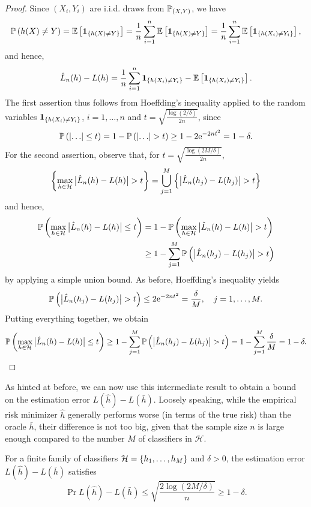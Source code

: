 \begin{proof}
Since $(X_i, Y_i)$ are i.i.d. draws from $\P_{(X, Y)}$, we have
\[
    \Pr{h(X) \neq Y} = \Ex{\indSet{h(X) \neq Y}} = \frac{1}{n} \sum_{i=1}^n \Ex{\indSet{h(X) \neq Y}} = \frac{1}{n} \sum_{i=1}^n \Ex{\indSet{h(X_i) \neq Y_i}},
\]
and hence,
\[
    \hat L_n(h) - L(h) = \frac{1}{n} \sum_{i=1}^n \indSet{h(X_i) \neq Y_i} - \Ex{\indSet{h(X_i) \neq Y_i}}.
\]
The first assertion thus follows from Hoeffding's inequality applied to the random variables $\indSet{h(X_i) \neq Y_i}$, $i = 1, \dots, n$ and $t = \sqrt{\frac{\log(2/\delta)}{2n}}$, since
\[
    \Pr{\abs{\ldots} \leq t} = 1 - \Pr{\abs{\ldots} > t} \geq 1 - 2\e^{-2nt^2} = 1 - \delta.
\]
For the second assertion, observe that, for $t = \sqrt{\frac{\log(2M/\delta)}{2n}}$,
\[
    \set{\max_{h \in \mathcal{H}} \bigAbs{ \hat L_n(h) - L(h) } > t} = \bigcup_{j=1}^M \set{\bigAbs{ \hat L_n(h_j) - L(h_j) } > t}
\]
and hence,
\begin{align*}
    \Pr{\max_{h \in \mathcal{H}} \bigAbs{ \hat L_n(h) - L(h) } \leq t} &= 1 - \Pr{\max_{h \in \mathcal{H}} \bigAbs{ \hat L_n(h) - L(h) } > t} \\
        &\geq 1 - \sum_{j=1}^M \Pr{\bigAbs{ \hat L_n(h_j) - L(h_j) } > t}
\end{align*}
by applying a simple union bound. As before, Hoeffding's inequality yields
\[
    \Pr{\bigAbs{ \hat L_n(h_j) - L(h_j) } > t} \leq 2\e^{-2nt^2} = \frac{\delta}{M}, \quad j = 1, \dots, M.
\]
Putting everything together, we obtain
\[
    \Pr{\max_{h \in \mathcal{H}} \bigAbs{ \hat L_n(h) - L(h) } \leq t} \geq 1 - \sum_{j=1}^M \Pr{\bigAbs{ \hat L_n(h_j) - L(h_j) } > t} = 1 - \sum_{j=1}^M \frac{\delta}{M} = 1 - \delta.
\]
\end{proof}

As hinted at before, we can now use this intermediate result to obtain a bound on the estimation error $L(\hat h) - L(\bar h)$. Loosely speaking, while the empirical risk minimizer $\hat h$ generally performs worse (in terms of the true risk) than the oracle $\bar h$, their difference is not too big, given that the sample size $n$ is large enough compared to the number $M$ of classifiers in $\mathcal{H}$.

\begin{theorem}
\label{thm: estimation error finite dictionary}
For a finite family of classifiers $\mathcal{H} = \set{h_1, \dots, h_M}$ and $\delta > 0$, the estimation error $L(\hat h) - L(\bar h)$ satisfies
\[
    \Pr{L(\hat h) - L(\bar h) \leq \sqrt{\frac{2\log(2M/\delta)}{n}}} \geq 1 - \delta.
\]
\end{theorem}


